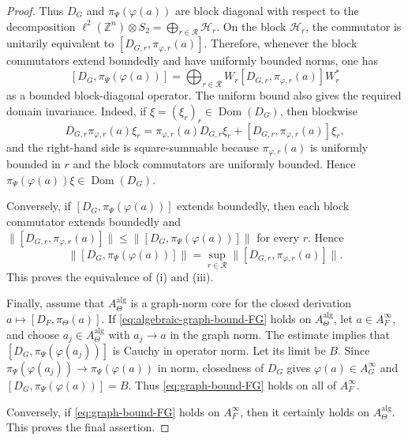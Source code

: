 \documentclass[11pt]{amsart}
\theoremstyle{definition}
\theoremstyle{remark}
\newcommand{\Z}{\mathbb{Z}}
\begin{document}
\begin{proof}
Thus $D_G$ and $\pi_\Psi(\varphi(a))$ are block diagonal with respect to
the decomposition $\ell^2(\Z^n)\otimes S_2
=\bigoplus_{r\in\mathcal R}\mathcal H_r.$
On the block $\mathcal H_r$, the commutator is unitarily equivalent to $[D_{G,r},\pi_{\varphi,r}(a)].$
Therefore, whenever the block commutators extend boundedly and have uniformly
bounded norms, one has
\[
[D_G,\pi_\Psi(\varphi(a))]
=
\bigoplus_{r\in\mathcal R}
W_r[D_{G,r},\pi_{\varphi,r}(a)]W_r^*
\]
as a bounded block-diagonal operator. The uniform bound also gives the required domain invariance. Indeed, if
$\xi=(\xi_r)_r\in\operatorname{Dom}(D_G)$, then blockwise
\[
D_{G,r}\pi_{\varphi,r}(a)\xi_r
=
\pi_{\varphi,r}(a)D_{G,r}\xi_r
+
[D_{G,r},\pi_{\varphi,r}(a)]\xi_r,
\]
and the right-hand side is square-summable because
$\pi_{\varphi,r}(a)$ is uniformly bounded in $r$ and the block
commutators are uniformly bounded. Hence
$\pi_\Psi(\varphi(a))\xi\in\operatorname{Dom}(D_G)$.



Conversely, if $[D_G,\pi_\Psi(\varphi(a))]$
extends boundedly, then each block commutator extends boundedly and
$\bigl\|[D_{G,r},\pi_{\varphi,r}(a)]\bigr\|\leq\bigl\|[D_G,\pi_\Psi(\varphi(a))]\bigr\|$
for every $r$. Hence
\[
\|[D_G,\pi_\Psi(\varphi(a))]\|
=
\sup_{r\in\mathcal R}
\bigl\|[D_{G,r},\pi_{\varphi,r}(a)]\bigr\|.
\]
This proves the equivalence of \textup{(i)} and \textup{(iii)}.

Finally, assume that $A_\Theta^{\mathrm{alg}}$ is a graph-norm core for the
closed derivation $a\mapsto [D_F,\pi_\Theta(a)].$
If \eqref{eq:algebraic-graph-bound-FG} holds on $A_\Theta^{\mathrm{alg}}$,
let $a\in A_F^\infty$, and choose $a_j\in A_\Theta^{\mathrm{alg}}$ with
$a_j\to a$ in the graph norm. The estimate implies that $[D_G,\pi_\Psi(\varphi(a_j))]$
is Cauchy in operator norm. Let its limit be $B$. Since $\pi_\Psi(\varphi(a_j))\to\pi_\Psi(\varphi(a))$
in norm, closedness of $D_G$ gives $\varphi(a)\in A_G^\infty$ and
$[D_G,\pi_\Psi(\varphi(a))]=B.$
Thus \eqref{eq:graph-bound-FG} holds on all of $A_F^\infty$.  

Conversely, if \eqref{eq:graph-bound-FG} holds
on $A_F^\infty$, then it certainly holds on $A_\Theta^{\mathrm{alg}}$.
This proves the final assertion.
\end{proof}
\end{document}

